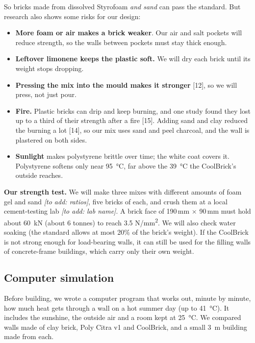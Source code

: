 \documentclass[11pt,a4paper]{article}
\newcommand{\toadd}[1]{\textit{\color{soft}[to add: #1]}}
\begin{document}
So bricks made from dissolved Styrofoam \emph{and sand} can pass the
standard. But research also shows some risks for our design:
\begin{itemize}
  \item \textbf{More foam or air makes a brick weaker}. Our air and salt
        pockets will reduce strength, so the walls between pockets must stay
        thick enough.
  \item \textbf{Leftover limonene keeps the plastic soft.} We will dry each
        brick until its weight stops dropping.
  \item \textbf{Pressing the mix into the mould makes it stronger} [12], so
        we will press, not just pour.
  \item \textbf{Fire.} Plastic bricks can drip and keep burning, and one study
        found they lost up to a third of their strength after a fire [15].
        Adding sand and clay reduced the burning a lot [14], so our mix uses
        sand and peel charcoal, and the wall is plastered on both sides.
  \item \textbf{Sunlight} makes polystyrene brittle over time; the white coat
        covers it. Polystyrene softens only near \SI{95}{\celsius}, far above
        the \SI{39}{\celsius} the CoolBrick's outside reaches.
\end{itemize}

\textbf{Our strength test.} We will make three mixes with different amounts of
foam gel and sand \toadd{ratios}, five bricks of each, and crush them at a
local cement-testing lab \toadd{lab name}. A brick face of
190\,mm $\times$ 90\,mm must hold about \SI{60}{kN} (about 6 tonnes) to reach
3.5 N/mm\textsuperscript{2}. We will also check water soaking (the standard
allows at most 20\% of the brick's weight). If the CoolBrick is not strong
enough for load-bearing walls, it can still be used for the filling walls of
concrete-frame buildings, which carry only their own weight.

\subsection{Computer simulation}
Before building, we wrote a computer program that works out, minute by
minute, how much heat gets through a wall on a hot summer day (up to
\SI{41}{\celsius}). It includes the sunshine, the outside air and a room
kept at \SI{25}{\celsius}. We compared walls made of clay brick, Poly Citra
v1 and CoolBrick, and a small \SI{3}{m} building made from each.
\end{document}
